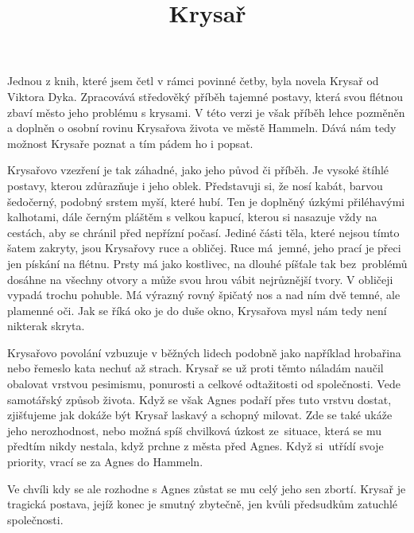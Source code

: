 \documentclass{article}
\title{Krysař}
\date{}
\author{}
\begin{document}
\maketitle

\large
Jednou z knih, které jsem četl v rámci povinné četby, byla novela Krysař od Viktora Dyka. Zpracovává středověký příběh tajemné postavy, která svou flétnou zbaví město jeho problému s krysami. V této verzi je však příběh lehce pozměněn a doplněn o osobní rovinu Krysařova života ve městě Hammeln. Dává nám tedy možnost Krysaře poznat a tím pádem ho i popsat.

Krysařovo vzezření je tak záhadné, jako jeho původ či příběh. Je vysoké štíhlé postavy, kterou zdůrazňuje i jeho oblek. Představuji si, že nosí kabát, barvou šedočerný, podobný srstem myší, které hubí. Ten je doplněný úzkými přiléhavými kalhotami, dále černým pláštěm s velkou kapucí, kterou si nasazuje vždy na cestách, aby se chránil před nepřízní počasí. Jediné části těla, které nejsou tímto šatem zakryty, jsou Krysařovy ruce a obličej. Ruce má~jemné, jeho prací je přeci jen pískání na flétnu. Prsty má jako kostlivec, na dlouhé píšťale tak bez~problémů dosáhne na všechny otvory a může svou hrou vábit nejrůznější tvory. V obličeji vypadá trochu pohuble. Má výrazný rovný špičatý nos a nad ním dvě temné, ale plamenné oči. Jak se říká oko je do duše okno, Krysařova mysl nám tedy není nikterak skryta.

Krysařovo povolání vzbuzuje v běžných lidech podobně jako například hrobařina nebo řemeslo kata nechuť až strach. Krysař se už proti těmto náladám naučil obalovat vrstvou pesimismu, ponurosti a celkové odtažitosti od společnosti. Vede samotářský způsob života. Když se však Agnes podaří přes tuto vrstvu dostat, zjišťujeme jak dokáže být Krysař laskavý a schopný milovat. Zde se také ukáže jeho nerozhodnost, nebo možná spíš chvilková úzkost ze~situace, která se mu předtím nikdy nestala, když prchne z města před Agnes. Když si~utřídí svoje priority, vrací se za Agnes do Hammeln.

Ve chvíli kdy se ale rozhodne s Agnes zůstat se mu celý jeho sen zbortí. Krysař je tragická postava, jejíž konec je smutný zbytečně, jen kvůli předsudkům zatuchlé společnosti.
\end{document}
